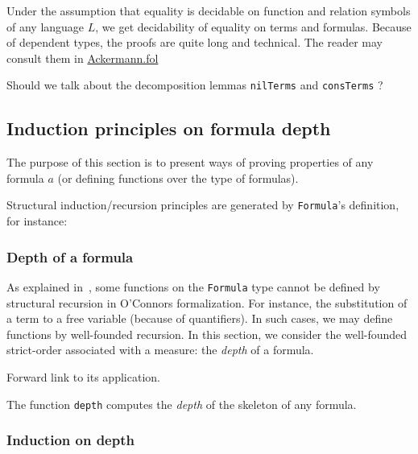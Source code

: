 Under the assumption that equality is decidable on 
function and relation symbols of any language $L$,
we get decidability of equality on terms and formulas.
Because of dependent types, the proofs are quite long and technical. The reader may consult them in \href{../theories/html/hydras.Ackermann.fol.html}{Ackermann.fol}

\begin{todo}
  Should we talk about the decomposition lemmas
\texttt{nilTerms} and \texttt{consTerms} ?
\end{todo}


\subsection{Induction principles on formula depth}

The purpose of this section is to present ways of proving 
properties of any formula $a$ (or defining functions over the type of formulas).

Structural induction/recursion principles are generated by 
\texttt{Formula}'s definition, for instance:








\subsubsection{Depth of a formula}
As explained in~\cite{OConnor05}, some functions on the \texttt{Formula} type cannot be defined by structural recursion in 
O'Connors formalization. For instance, the substitution of a term to a free variable (because of quantifiers). 
In such cases, we may define functions by well-founded recursion. In this section, we consider the well-founded strict-order associated with a measure: the \emph{depth} of a formula.

\begin{todo}
Forward link to its application.
\end{todo}


The function \texttt{depth} computes the \emph{depth} of the 
 skeleton of any formula.


\subsubsection{Induction on depth}

